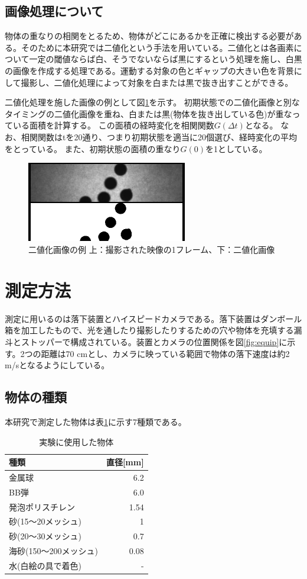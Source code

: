 \documentclass[a4paper,10pt,twocolumn,dvipdfmx]{jsarticle}
\begin{document}
\subsection{画像処理について}
物体の重なりの相関をとるため、物体がどこにあるかを正確に検出する必要がある。そのために本研究では二値化という手法を用いている。二値化とは各画素について一定の閾値ならば白、そうでないならば黒にするという処理を施し、白黒の画像を作成する処理である。運動する対象の色とギャップの大きい色を背景にして撮影し、二値化処理によって対象を白または黒で抜き出すことができる。 \par
二値化処理を施した画像の例として図\ref{fig:threshold}を示す。
初期状態での二値化画像と別なタイミングの二値化画像を重ね、白または黒(物体を抜き出している色)が重なっている面積を計算する。
この面積の経時変化を相関関数$G(\Delta t)$となる。
なお、相関関数はtを20通り、つまり初期状態を適当に20個選び、経時変化の平均をとっている。
また、初期状態の面積の重なり$G(0)$を1としている。
\begin{figure}[H]
	\includegraphics[clip,width=7.0cm]{bb.png}
	\caption{二値化画像の例 上：撮影された映像の1フレーム、下：二値化画像}
	\label{fig:threshold}
\end{figure}

\section{測定方法}
測定に用いるのは落下装置とハイスピードカメラである。落下装置はダンボール箱を加工したもので、光を通したり撮影したりするための穴や物体を充填する漏斗とストッパーで構成されている。装置とカメラの位置関係を図\ref{fig:equip}に示す。2つの距離は70 cmとし、カメラに映っている範囲で物体の落下速度は約2 m/sとなるようにしている。
\subsection{物体の種類}
本研究で測定した物体は表\ref{tb:ballkind}に示す7種類である。 \\
\begin{table}[H]
	\caption{実験に使用した物体 \label{tb:ballkind}}
	\begin{tabular}{lr}
		\toprule
		種類 & 直径[mm] \\
		\midrule
		金属球 & 6.2 \\
		BB弾 & 6.0 \\
		発泡ポリスチレン & 1.54 \\
		砂(15〜20メッシュ) & 1 \\
		砂(20〜30メッシュ) & 0.7 \\
		海砂(150〜200メッシュ) & 0.08 \\
		水(白絵の具で着色) & - \\
		\bottomrule
	\end{tabular}
\end{table}
\end{document}
